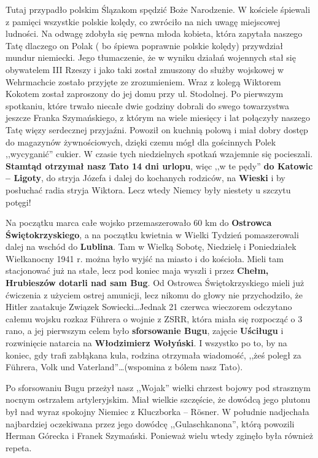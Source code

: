 Tutaj przypadło polskim Ślązakom spędzić Boże Narodzenie. W kościele śpiewali z pamięci wszystkie polskie kolędy, co zwróciło na nich uwagę miejscowej ludności. Na odwagę zdobyła się pewna młoda kobieta, która zapytała naszego Tatę dlaczego on Polak ( bo śpiewa poprawnie polskie kolędy) przywdział mundur niemiecki. Jego tłumaczenie, że w wyniku działań wojennych stał się obywatelem III Rzeszy i jako taki został zmuszony do służby wojskowej w Wehrmachcie zostało przyjęte ze zrozumieniem. Wraz z kolegą Wiktorem Kokotem został zaproszony do jej domu przy ul. Stodolnej. Po pierwszym spotkaniu, które trwało niecałe dwie godziny dobrali do swego towarzystwa jeszcze Franka Szymańskiego, z którym na wiele miesięcy i lat połączyły naszego Tatę więzy serdecznej przyjaźni. Powoził on kuchnią polową i miał dobry dostęp do magazynów żywnościowych, dzięki czemu mógł dla gościnnych Polek ,,wycyganić'' cukier. W czasie tych niedzielnych spotkań wzajemnie się pocieszali. \textbf{Stamtąd otrzymał nasz Tato 14 dni urlopu}, więc ,,w te pędy'' \textbf{do Katowic -- Ligoty}, do stryja Józefa i dalej do kochanych rodziców, na \textbf{Wieski} i by posłuchać radia stryja Wiktora. Lecz wtedy Niemcy były niestety u szczytu potęgi!

Na początku marca całe wojsko przemaszerowało 60 km do \textbf{Ostrowca Świętokrzyskiego}, a na początku kwietnia w Wielki Tydzień pomaszerowali dalej na wschód do \textbf{Lublina}. Tam w Wielką Sobotę, Niedzielę i Poniedziałek Wielkanocny 1941 r. można było wyjść na miasto i do kościoła. Mieli tam stacjonować już na stałe, lecz pod koniec maja wyszli i przez \textbf{Chełm, Hrubieszów dotarli nad sam Bug}. Od Ostrowca Świętokrzyskiego mieli już ćwiczenia z użyciem ostrej amunicji, lecz nikomu do głowy nie przychodziło, że Hitler zaatakuje Związek Sowiecki\ldots Jednak 21 czerwca wieczorem odczytano całemu wojsku rozkaz Führera o wojnie z ZSRR, która miała się rozpocząć o 3 rano, a jej pierwszym celem było \textbf{sforsowanie Bugu}, zajęcie \textbf{Uściługu} i rozwinięcie natarcia na \textbf{Włodzimierz Wołyński}. I wszystko po to, by na koniec, gdy trafi  zabłąkana kula, rodzina otrzymała wiadomość, ,,żeś poległ za Führera, Volk und Vaterland''\ldots (wspomina z bólem nasz Tato).

Po sforsowaniu Bugu przeżył nasz ,,Wojak'' wielki chrzest bojowy pod strasznym nocnym ostrzałem artyleryjskim. Miał wielkie szczęście, że dowódcą jego plutonu był nad wyraz spokojny Niemiec z Kluczborka -- Rösner. W południe nadjechała najbardziej oczekiwana przez jego dowódcę ,,Gulaschkanona'', którą powozili Herman Górecka i Franek Szymański. Ponieważ wielu wtedy zginęło była również repeta.

